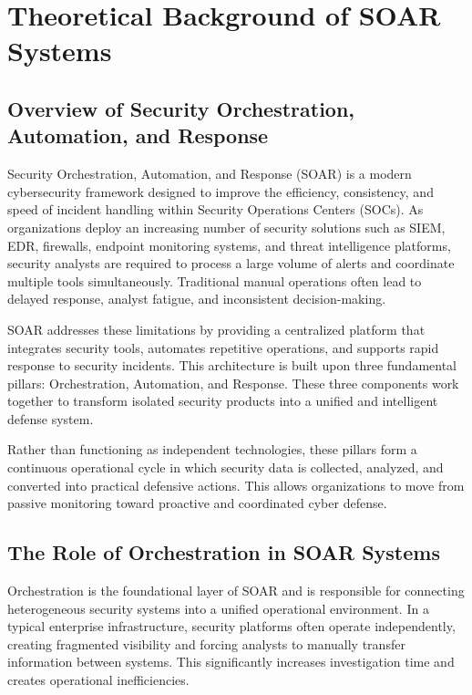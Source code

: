 \documentclass[12pt]{report}
\begin{document}
\section{Theoretical Background of SOAR Systems}

\subsection{Overview of Security Orchestration, Automation, and Response}

Security Orchestration, Automation, and Response (SOAR) is a modern cybersecurity framework designed to improve the efficiency, consistency, and speed of incident handling within Security Operations Centers (SOCs). As organizations deploy an increasing number of security solutions such as SIEM, EDR, firewalls, endpoint monitoring systems, and threat intelligence platforms, security analysts are required to process a large volume of alerts and coordinate multiple tools simultaneously. Traditional manual operations often lead to delayed response, analyst fatigue, and inconsistent decision-making.

SOAR addresses these limitations by providing a centralized platform that integrates security tools, automates repetitive operations, and supports rapid response to security incidents. This architecture is built upon three fundamental pillars: Orchestration, Automation, and Response. These three components work together to transform isolated security products into a unified and intelligent defense system.

Rather than functioning as independent technologies, these pillars form a continuous operational cycle in which security data is collected, analyzed, and converted into practical defensive actions. This allows organizations to move from passive monitoring toward proactive and coordinated cyber defense.

\subsection{The Role of Orchestration in SOAR Systems}

Orchestration is the foundational layer of SOAR and is responsible for connecting heterogeneous security systems into a unified operational environment. In a typical enterprise infrastructure, security platforms often operate independently, creating fragmented visibility and forcing analysts to manually transfer information between systems. This significantly increases investigation time and creates operational inefficiencies.
\end{document}
